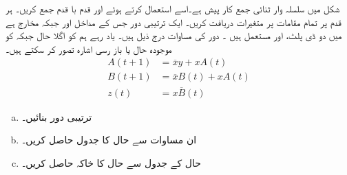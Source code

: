  شکل      میں سلسلہ وار ثنائی جمع کار  پیش ہے۔اسے استعمال کرتے ہوئے  اور   قدم با قدم   جمع کریں۔ ہر قدم پر  تمام مقامات پر متغیرات دریافت کریں۔
ایک ترتیبی  دور جس کے مداخل  اور   جبکہ مخارج  ہے   میں دو ڈی پلٹ،   اور  مستعمل ہیں ۔ دور کی مساوات درج ذیل   ہیں۔ یاد رہے ہم  کو اگلا حال  جبکہ  کو موجودہ حال یا باز رسی اشارہ   تصور کر سکتے ہیں۔
\begin{align*}
A(t+1)&=\overline{x}y+xA(t)\\
B(t+1)&=\overline{x}B(t)+xA(t)\\
z(t)&=x\overline{B}(t)
\end{align*}
\begin{enumerate}[a.]
\item
 ترتیبی دور  بنائیں۔ 
\item
  ان مساوات سے حال کا جدول حاصل کریں۔ 
\item
  حال  کے جدول سے حال کا خاکہ حاصل کریں۔
\end{enumerate}

